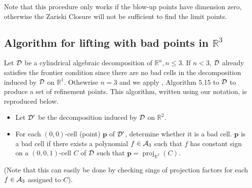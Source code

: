 \documentclass[
]{book}
\theoremstyle{definition}
\theoremstyle{definition}
\theoremstyle{definition}
\theoremstyle{definition}
\theoremstyle{remark}
\begin{document}
Note that this procedure only works if the blow-up points have dimension zero, otherwise the Zariski Closure will not be sufficient to find the limit points.

\hypertarget{algorithm-for-lifting-with-bad-points-in-mathbbr3}{%
\subsection{\texorpdfstring{Algorithm for lifting with bad points in \(\mathbb{R}^3\)}{Algorithm for lifting with bad points in \textbackslash mathbb\{R\}\^{}3}}\label{algorithm-for-lifting-with-bad-points-in-mathbbr3}}

Let \(\cal D\) be a cylindrical algebraic decomposition of \(\mathbb{R}^n, n \le 3\). If \(n < 3\), \(\cal D\) already satisfies the frontier condition since there are no bad cells in the decomposition induced by \(\cal D\) on \(\mathbb{R}^1\). Othewrise \(n=3\) and we apply \citet{lazard10}, Algorithm 5.15 to \(\cal D\) to produce a set of refinement points. This algorithm, written using our notation, is reproduced below.

\begin{itemize}
\item
  Let \(\cal D'\) be the decomposition induced by \(\cal D\) on \(\mathbb{R}^2\).
\item
  For each \((0,0)\)-cell (point) \(\mathbf{p}\) of \(\cal D'\), determine whether it is a bad cell. \(\mathbf{p}\) is a bad cell if there exists a polynomial \(f \in {\cal A}_3\) such that \(f\) has constant sign on a \((0,0,1)\)-cell \(C\) of \(\cal D\) such that \(\mathbf{p} = {\operatorname{proj}_{\mathbb{R}^{2}}}(C)\).
\end{itemize}

(Note that this can easily be done by checking sings of projection factors for each \(f \in {\cal A}_3\) assigned to \(C\)).
\end{document}
